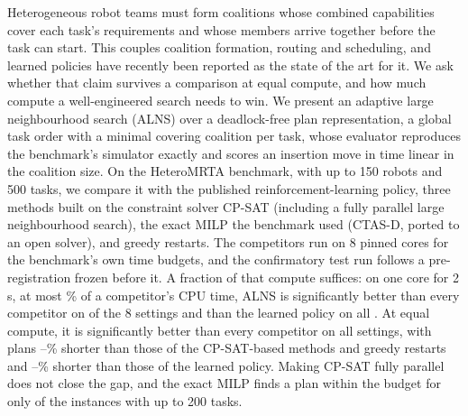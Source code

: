 Heterogeneous robot teams must form coalitions whose combined capabilities cover each task's requirements and
whose members arrive together before the task can start. This couples coalition formation, routing and scheduling,
and learned policies have recently been reported as the state of the art for it. We ask whether that claim survives a
comparison at equal compute, and how much compute a well-engineered search needs to win. We present an adaptive large neighbourhood search (ALNS) over a deadlock-free plan
representation, a global task order with a minimal covering coalition per task, whose evaluator reproduces the
benchmark's simulator exactly and scores an insertion move in time linear in the coalition size. On the HeteroMRTA
benchmark, with up to 150 robots and 500 tasks, we compare it with the published reinforcement-learning policy,
three methods built on the constraint solver CP-SAT (including a fully parallel large neighbourhood search), the exact
MILP the benchmark used (CTAS-D, ported to an open solver), and
greedy restarts.
The competitors run on 8 pinned cores for the benchmark's own time budgets, and the confirmatory test run follows a
pre-registration frozen before it. A fraction of that compute suffices: on one core for 2\,s, at most
\ShareTwohi\% of a competitor's CPU time, ALNS is significantly better than every competitor on \Ctwoheld{} of the 8
settings and than the learned policy on all \CtwoRLheld{}. At equal compute, it is significantly
better than every competitor on all \ConeBheld{} settings, with plans \mbox{\ConeBclasslo--\ConeBclasshi\%} shorter
than those of the CP-SAT-based methods and greedy restarts and \mbox{\ConeBrlgainlo--\ConeBrlgainhi\%} shorter than
those of the learned policy. Making CP-SAT fully parallel does not close the gap, and the exact MILP finds a plan
within the budget for only \CtasSolved{} of the \CtasRuns{} instances with up to 200 tasks.

